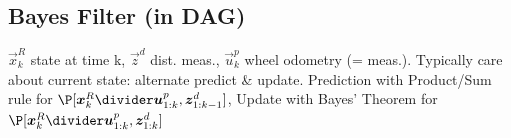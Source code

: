 \subsection{Bayes Filter (in DAG)}
$\vec{x}_k^R$ state at time k, $\vec{z}^d$ dist. meas., $\vec{u}^p_k$ wheel odometry (= meas.).
Typically care about current state: alternate predict \& update.
Prediction with Product/Sum rule for $\P[\vec{x}_k^R \divider \vec{u}_{1:k}^p, \vec{z}_{1:k - 1}^d]$,
Update with Bayes' Theorem for $\P[\vec{x}_k^R \divider \vec{u}_{1:k}^p, \vec{z}_{1:k}^d]$

%
